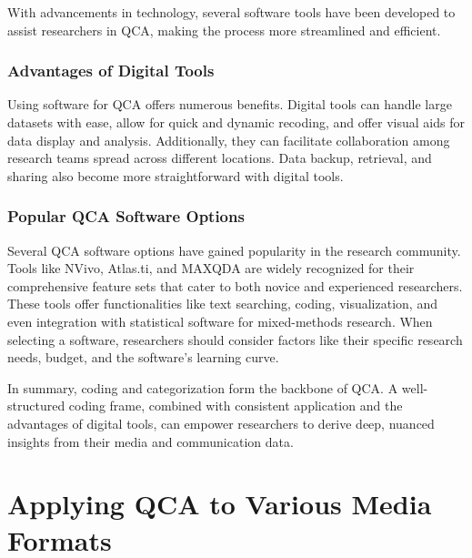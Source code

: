 \documentclass[
  b5paper]{book}
\begin{document}
With advancements in technology, several software tools have been developed to assist researchers in QCA, making the process more streamlined and efficient.

\hypertarget{advantages-of-digital-tools}{%
\subsubsection*{Advantages of Digital Tools}\label{advantages-of-digital-tools}}

Using software for QCA offers numerous benefits. Digital tools can handle large datasets with ease, allow for quick and dynamic recoding, and offer visual aids for data display and analysis. Additionally, they can facilitate collaboration among research teams spread across different locations. Data backup, retrieval, and sharing also become more straightforward with digital tools.

\hypertarget{popular-qca-software-options}{%
\subsubsection*{Popular QCA Software Options}\label{popular-qca-software-options}}

Several QCA software options have gained popularity in the research community. Tools like NVivo, Atlas.ti, and MAXQDA are widely recognized for their comprehensive feature sets that cater to both novice and experienced researchers. These tools offer functionalities like text searching, coding, visualization, and even integration with statistical software for mixed-methods research. When selecting a software, researchers should consider factors like their specific research needs, budget, and the software's learning curve.

In summary, coding and categorization form the backbone of QCA. A well-structured coding frame, combined with consistent application and the advantages of digital tools, can empower researchers to derive deep, nuanced insights from their media and communication data.

\hypertarget{applying-qca-to-various-media-formats}{%
\section{Applying QCA to Various Media Formats}\label{applying-qca-to-various-media-formats}}
\end{document}
